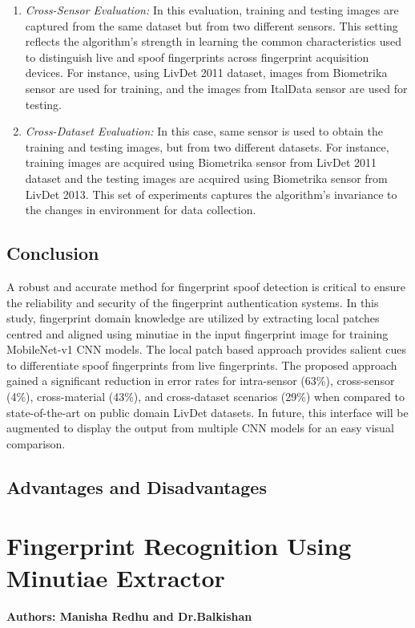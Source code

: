 \begin{enumerate}
\item \textit{Cross-Sensor Evaluation:}
 In this evaluation, training and testing images are captured from the same dataset but from two different sensors. This setting reflects the algorithm's strength in learning the common characteristics used to distinguish live and spoof fingerprints across fingerprint
acquisition devices. For instance, using LivDet 2011 dataset, images from Biometrika sensor are used for training, and the images from ItalData sensor are used for testing. 
\item \textit{Cross-Dataset Evaluation:}
 In this case, same sensor is used to obtain the training and testing images, but from two different datasets. For instance, training images are acquired using Biometrika sensor from LivDet 2011 dataset and the testing images are acquired using Biometrika sensor from LivDet 2013. This set of experiments captures the algorithm's invariance to the changes in environment for data collection.
\end{enumerate} 
\subsection{Conclusion}
A robust and accurate method for fingerprint spoof detection is critical to ensure the reliability and security of the fingerprint authentication systems. In this study, fingerprint domain knowledge are utilized by extracting local patches centred and aligned using minutiae in the input fingerprint image for training MobileNet-v1 CNN models. The local patch based approach provides salient cues to differentiate spoof fingerprints from live fingerprints. The proposed approach gained a significant reduction in error rates for intra-sensor (63\%), cross-sensor (4\%), cross-material (43\%),
and cross-dataset scenarios (29\%) when compared to state-of-the-art on public domain LivDet datasets.
In future, this interface will be augmented to display the output from multiple CNN models for an easy visual comparison.

\subsection{Advantages and Disadvantages}
\section{Fingerprint Recognition Using Minutiae Extractor}
\textbf{Authors: Manisha Redhu and Dr.Balkishan}
